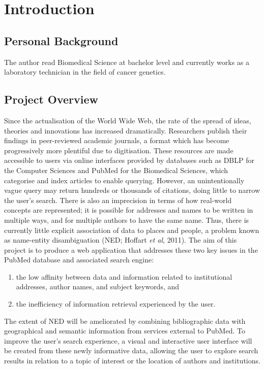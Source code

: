 \documentclass[PROP_AGutteridge_CS.tex]{subfiles}
\begin{document}
\chapter{Introduction}
\section{Personal Background}
The author read Biomedical Science at bachelor level and currently works as a laboratory technician in the field of cancer genetics.

\section{Project Overview}
Since the actualisation of the World Wide Web, the rate of the spread of ideas, theories and innovations has increased dramatically. Researchers publish their findings in peer-reviewed academic journals, a format which has become progressively more plentiful due to digitisation. These resources are made accessible to users via online interfaces provided by databases such as DBLP for the Computer Sciences and PubMed for the Biomedical Sciences, which categorise and index articles to enable querying. However, an unintentionally vague query may return hundreds or thousands of citations, doing little to narrow the user's search. There is also an imprecision in terms of how real-world concepts are represented; it is possible for addresses and names to be written in multiple ways, and for multiple authors to have the same name. Thus, there is currently little explicit association of data to places and people, a problem known as name-entity disambiguation (NED; Hoffart \emph{et al}, 2011). The aim of this project is to produce a web application that addresses these two key issues in the PubMed database and associated search engine:
\begin{enumerate}
\item the low affinity between data and information related to institutional addresses, author names, and subject keywords, and
\item the inefficiency of information retrieval experienced by the user.
\end{enumerate}
The extent of NED will be ameliorated by combining bibliographic data with geographical and semantic information from services external to PubMed. To improve the user's search experience, a visual and interactive user interface will be created from these newly informative data, allowing the user to explore search results in relation to a topic of interest or the location of authors and institutions. 
\end{document}
